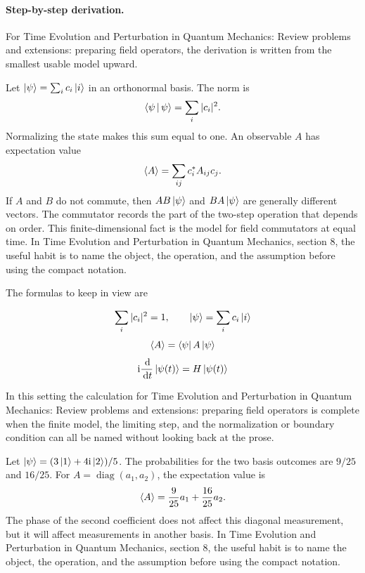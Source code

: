 \paragraph{Step-by-step derivation.}

For Time Evolution and Perturbation in Quantum Mechanics: Review problems and extensions: preparing field operators, the derivation is written from the smallest usable model upward.

Let \(\left|\psi\right\rangle=\sum_i c_i\left|i\right\rangle\) in an orthonormal basis.  The norm is
\[
  \left\langle \psi\,\middle|\,\psi\right\rangle=\sum_i |c_i|^2.
\]
Normalizing the state makes this sum equal to one.  An observable \(A\) has expectation value
\[
  \left\langle A\right\rangle=\sum_{ij}c_i^*A_{ij}c_j.
\]
If \(A\) and \(B\) do not commute, then \(AB\left|\psi\right\rangle\) and \(BA\left|\psi\right\rangle\) are generally different vectors.  The commutator records the part of the two-step operation that depends on order.  This finite-dimensional fact is the model for field commutators at equal time.  In Time Evolution and Perturbation in Quantum Mechanics, section 8, the useful habit is to name the object, the operation, and the assumption before using the compact notation.

The formulas to keep in view are

\[
  \sum_i |c_i|^2=1,\qquad \left|\psi\right\rangle=\sum_i c_i\left|i\right\rangle
\]
\[
  \left\langle A\right\rangle=\left\langle \psi\right|A\left|\psi\right\rangle
\]
\[
  \mathrm i\frac{\,\mathrm d}{\,\mathrm d t}\left|\psi(t)\right\rangle=H\left|\psi(t)\right\rangle
\]

In this setting the calculation for Time Evolution and Perturbation in Quantum Mechanics: Review problems and extensions: preparing field operators is complete when the finite model, the limiting step, and the normalization or boundary condition can all be named without looking back at the prose.




\begin{example}
Let \(\left|\psi\right\rangle=(3\left|1\right\rangle+4\mathrm i\left|2\right\rangle)/5\).  The probabilities for the two basis outcomes are \(9/25\) and \(16/25\).  For \(A=\operatorname{diag}(a_1,a_2)\), the expectation value is
\[
  \left\langle A\right\rangle=\frac{9}{25}a_1+\frac{16}{25}a_2.
\]
The phase of the second coefficient does not affect this diagonal measurement, but it will affect measurements in another basis.  In Time Evolution and Perturbation in Quantum Mechanics, section 8, the useful habit is to name the object, the operation, and the assumption before using the compact notation.
\end{example}



